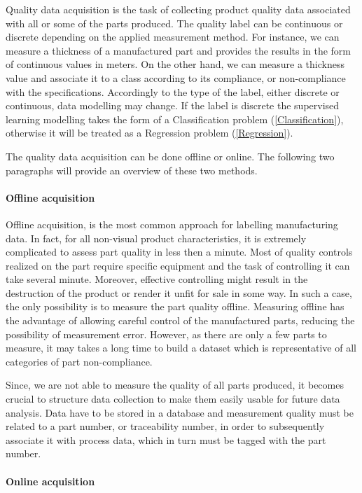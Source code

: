 Quality data acquisition is the task of collecting product quality data associated with all or some of the parts produced. The quality label can be continuous or discrete depending on the applied measurement method. For instance, we can measure a thickness of a manufactured part and provides the results in the form of continuous values in meters. On the other hand, we can measure a thickness value and associate it to  a class according to its compliance, or non-compliance with the specifications. Accordingly to the type of the label, either discrete or continuous, data modelling may change. If the label is discrete the supervised learning modelling takes the form of a Classification problem (\ref{Classification}), otherwise it will be treated as a Regression problem (\ref{Regression}).   

The quality data acquisition can be done offline or online. The following two paragraphs will provide an overview of these two methods. 


\paragraph{Offline acquisition}

Offline acquisition, is the most common approach for labelling manufacturing data. In fact, for all non-visual product characteristics, it is extremely complicated to assess part quality in less then a minute. Most of quality controls realized on the part require specific equipment and the task of controlling it can take several minute. Moreover, effective controlling might result in the destruction of the product or render it unfit for sale in some way. In such a case, the only possibility is to measure the part quality offline. Measuring offline has the advantage of allowing careful control of the manufactured parts, reducing the possibility of measurement error. However, as there are only a few parts to measure, it may takes a long time to build a dataset which is representative of all categories of part non-compliance.

Since, we are not able to measure the quality of all parts produced, it becomes crucial to structure data collection to make them easily usable for future data analysis. Data have to be stored in a database and  measurement quality must be related to a part number, or traceability number, in order to subsequently associate it with process data, which in turn must be tagged with the part number. 


\paragraph{Online acquisition}

